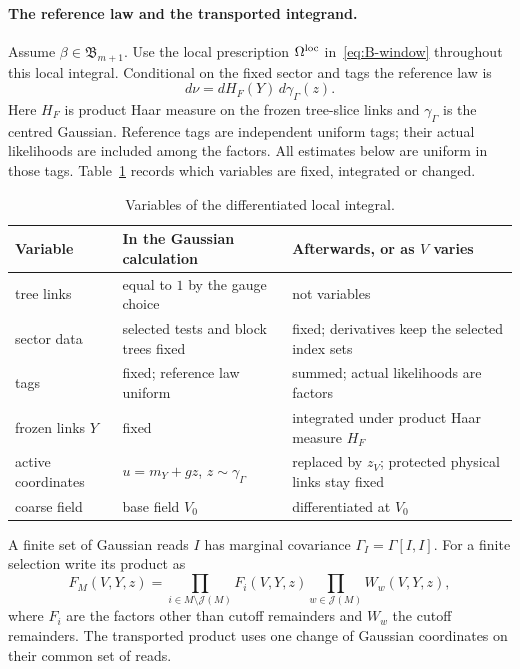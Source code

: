 \paragraph{The reference law and the transported integrand.} Assume $\beta\in\mathfrak B_{m+1}$. Use the local prescription $\Omega^{\rm loc}$ in~\eqref{eq:B-window} throughout this local integral. Conditional on the fixed sector and tags the reference law is
\begin{equation*}
d\nu=dH_F(Y)\,d\gamma_\Gamma(z).
\end{equation*}
Here $H_F$ is product Haar measure on the frozen tree-slice links and $\gamma_\Gamma$ is the centred Gaussian. Reference tags are independent uniform tags; their actual likelihoods are included among the factors. All estimates below are uniform in those tags. Table~\ref{tab:B-variables} records which variables are fixed, integrated or changed.

\begin{table}[ht]
\centering\small
\begin{tabular}{@{}p{}p{}p{}@{}}
\toprule
\raggedright Variable & \raggedright In the Gaussian calculation & \raggedright Afterwards, or as $V$ varies\tabularnewline
\midrule
\raggedright tree links & \raggedright equal to $1$ by the gauge choice & \raggedright not variables\tabularnewline
\raggedright sector data & \raggedright selected tests and block trees fixed & \raggedright fixed; derivatives keep the selected index sets\tabularnewline
\raggedright tags & \raggedright fixed; reference law uniform & \raggedright summed; actual likelihoods are factors\tabularnewline
\raggedright frozen links $Y$ & \raggedright fixed & \raggedright integrated under product Haar measure $H_F$\tabularnewline
\raggedright active coordinates & \raggedright $u=m_Y+gz$, $z\sim\gamma_\Gamma$ & \raggedright replaced by $z_V$; protected physical links stay fixed\tabularnewline
\raggedright coarse field & \raggedright base field $V_0$ & \raggedright differentiated at $V_0$\tabularnewline
\bottomrule
\end{tabular}
\caption{Variables of the differentiated local integral.}\label{tab:B-variables}
\end{table} A finite set of Gaussian reads $I$ has marginal covariance $\Gamma_I=\Gamma[I,I]$. For a finite selection write its product as
\begin{equation*}
F_M(V,Y,z)=\prod_{i\in M\setminus\mathcal J(M)}F_i(V,Y,z)
             \prod_{w\in\mathcal J(M)}W_w(V,Y,z),
\end{equation*}
where $F_i$ are the factors other than cutoff remainders and $W_w$ the cutoff remainders. The transported product uses one change of Gaussian coordinates on their common set of reads.

